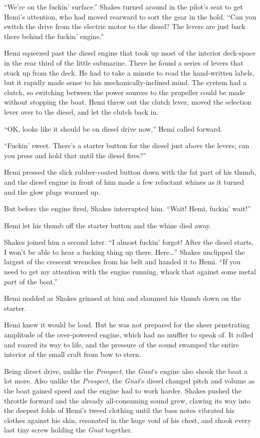 \documentclass[
]{scrbook}
\begin{document}
``We're on the fuckin' surface.'' Shakes turned around in the pilot's
seat to get Hemi's attention, who had moved rearward to sort the gear in
the hold. ``Can you switch the drive from the electric motor to the
diesel? The levers are just back there behind the fuckin' engine.''

Hemi squeezed past the diesel engine that took up most of the interior
deck-space in the rear third of the little submarine. There he found a
series of levers that stuck up from the deck. He had to take a minute to
read the hand-written labels, but it rapidly made sense to his
mechanically-inclined mind. The system had a clutch, so switching
between the power sources to the propeller could be made without
stopping the boat. Hemi threw out the clutch lever, moved the selection
lever over to the diesel, and let the clutch back in.

``OK, looks like it should be on diesel drive now,'' Hemi called
forward.

``Fuckin' sweet. There's a starter button for the diesel just above the
levers; can you press and hold that until the diesel fires?''

Hemi pressed the slick rubber-coated button down with the fat part of
his thumb, and the diesel engine in front of him made a few reluctant
whines as it turned and the glow plugs warmed up.

But before the engine fired, Shakes interrupted him. ``Wait! Hemi,
fuckin' wait!''

Hemi let his thumb off the starter button and the whine died away.

Shakes joined him a second later. ``I almost fuckin' forgot! After the
diesel starts, I won't be able to hear a fucking thing up there.
Here\ldots{}'' Shakes unclipped the largest of the crescent wrenches
from his belt and handed it to Hemi. ``If you need to get my attention
with the engine running, whack that against some metal part of the
boat.''

Hemi nodded as Shakes grinned at him and slammed his thumb down on the
starter.

Hemi knew it would be loud. But he was not prepared for the sheer
penetrating amplitude of the over-powered engine, which had no muffler
to speak of. It rolled and roared its way to life, and the pressure of
the sound swamped the entire interior of the small craft from bow to
stern.

Being direct drive, unlike the \emph{Prospect}, the \emph{Gnat}'s engine
also shook the boat a lot more. Also unlike the \emph{Prospect}, the
\emph{Gnat}'s diesel changed pitch and volume as the boat gained speed
and the engine had to work harder. Shakes pushed the throttle forward
and the already all-consuming sound grew, clawing its way into the
deepest folds of Hemi's tweed clothing until the bass notes vibrated his
clothes against his skin, resonated in the huge void of his chest, and
shook every last tiny screw holding the \emph{Gnat} together.
\end{document}
